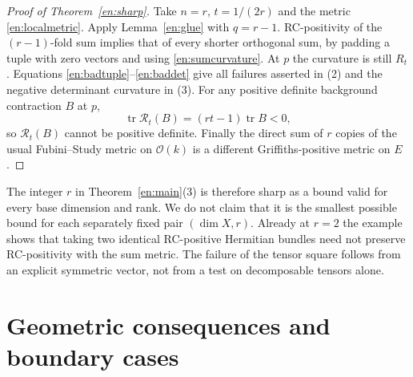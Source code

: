 \documentclass[12pt]{amsart}
\theoremstyle{definition}
\theoremstyle{remark}
\numberwithin{equation}{section}
\DeclareMathOperator{\tr}{tr}
\theoremstyle{definition}
\begin{document}
\begin{proof}[Proof of Theorem~\ref{en:sharp}]
Take $n=r$, $t=1/(2r)$ and the metric \eqref{en:localmetric}.
Apply Lemma~\ref{en:glue} with $q=r-1$. RC-positivity of the
$(r-1)$-fold sum implies that of every shorter orthogonal sum, by
padding a tuple with zero vectors and using \eqref{en:sumcurvature}.
At $p$ the curvature is still $R_t$. Equations
\eqref{en:badtuple}--\eqref{en:baddet} give all failures asserted
in (2) and the negative determinant curvature in (3).
For any positive definite background contraction $B$ at $p$,
\[
 \tr\mathcal R_t(B)=(rt-1)\tr B<0,
\]
so $\mathcal R_t(B)$ cannot be positive definite. Finally the direct
sum of $r$ copies of the usual Fubini--Study metric on $\mathcal O(k)$
is a different Griffiths-positive metric on $E$.
\end{proof}

The integer $r$ in Theorem~\ref{en:main}(3) is therefore sharp as a
bound valid for every base dimension and rank. We do not claim that it
is the smallest possible bound for each separately fixed pair $(\dim X,r)$.
Already at $r=2$ the example shows that taking two identical RC-positive
Hermitian bundles need not preserve RC-positivity with the sum metric.
The failure of the tensor square follows from an explicit symmetric
vector, not from a test on decomposable tensors alone.

\section{Geometric consequences and boundary cases}
\label{en:applications}
\end{document}
